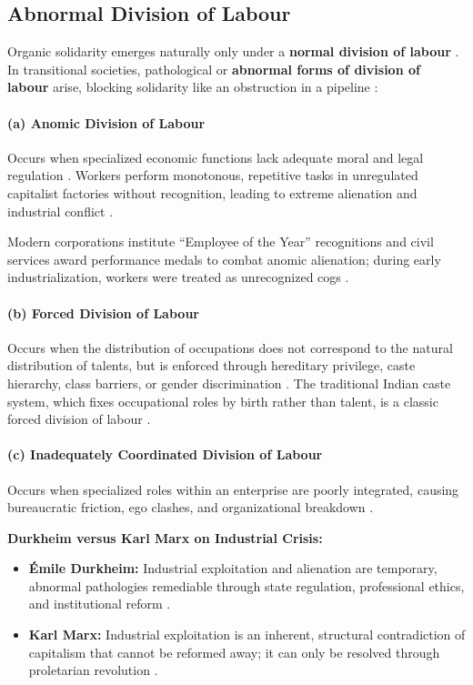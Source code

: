\subsection{Abnormal Division of Labour}
Organic solidarity emerges naturally only under a \textbf{normal division of labour} . In transitional societies, pathological or \textbf{abnormal forms of division of labour} arise, blocking solidarity like an obstruction in a pipeline :

\paragraph{(a) Anomic Division of Labour}
Occurs when specialized economic functions lack adequate moral and legal regulation . Workers perform monotonous, repetitive tasks in unregulated capitalist factories without recognition, leading to extreme alienation and industrial conflict .

\begin{ExampleBox}
Modern corporations institute ``Employee of the Year'' recognitions and civil services award performance medals to combat anomic alienation; during early industrialization, workers were treated as unrecognized cogs .
\end{ExampleBox}

\paragraph{(b) Forced Division of Labour}
Occurs when the distribution of occupations does not correspond to the natural distribution of talents, but is enforced through hereditary privilege, caste hierarchy, class barriers, or gender discrimination . The traditional Indian caste system, which fixes occupational roles by birth rather than talent, is a classic forced division of labour .

\paragraph{(c) Inadequately Coordinated Division of Labour}
Occurs when specialized roles within an enterprise are poorly integrated, causing bureaucratic friction, ego clashes, and organizational breakdown .

\begin{ComparisonBox}
\textbf{Durkheim versus Karl Marx on Industrial Crisis:}
\begin{itemize}
    \item \textbf{Émile Durkheim:} Industrial exploitation and alienation are temporary, abnormal pathologies remediable through state regulation, professional ethics, and institutional reform .
    \item \textbf{Karl Marx:} Industrial exploitation is an inherent, structural contradiction of capitalism that cannot be reformed away; it can only be resolved through proletarian revolution .
\end{itemize}
\end{ComparisonBox}

